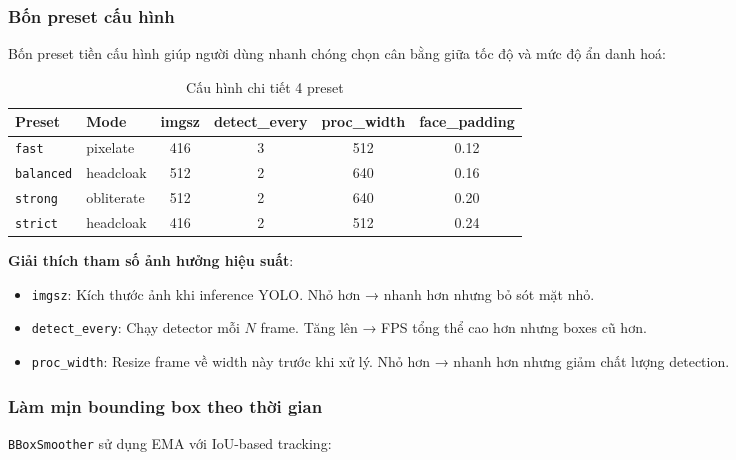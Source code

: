 \subsubsection{Bốn preset cấu hình}
\label{subsubsec:presets}

Bốn preset tiền cấu hình giúp người dùng nhanh chóng chọn cân bằng giữa tốc độ và mức độ ẩn danh hoá:

\begin{table}[H]
\centering
\caption{Cấu hình chi tiết 4 preset}
\label{tab:presets}
{\small
\begin{tabular}{|l|l|c|c|c|c|}
\hline
\textbf{Preset} & \textbf{Mode} & \textbf{imgsz} & \textbf{detect\_every} & \textbf{proc\_width} & \textbf{face\_padding} \\
\hline
\texttt{fast} & pixelate & 416 & 3 & 512 & 0.12 \\
\texttt{balanced} & headcloak & 512 & 2 & 640 & 0.16 \\
\texttt{strong} & obliterate & 512 & 2 & 640 & 0.20 \\
\texttt{strict} & headcloak & 416 & 2 & 512 & 0.24 \\
\hline
\end{tabular}
}
\end{table}

\textbf{Giải thích tham số ảnh hưởng hiệu suất}:
\begin{itemize}
    \item \texttt{imgsz}: Kích thước ảnh khi inference YOLO. Nhỏ hơn → nhanh hơn nhưng bỏ sót mặt nhỏ.
    \item \texttt{detect\_every}: Chạy detector mỗi $N$ frame. Tăng lên → FPS tổng thể cao hơn nhưng boxes cũ hơn.
    \item \texttt{proc\_width}: Resize frame về width này trước khi xử lý. Nhỏ hơn → nhanh hơn nhưng giảm chất lượng detection.
\end{itemize}

\subsubsection{Làm mịn bounding box theo thời gian}
\label{subsubsec:bboxsmooth}

\texttt{BBoxSmoother} sử dụng EMA với IoU-based tracking:

